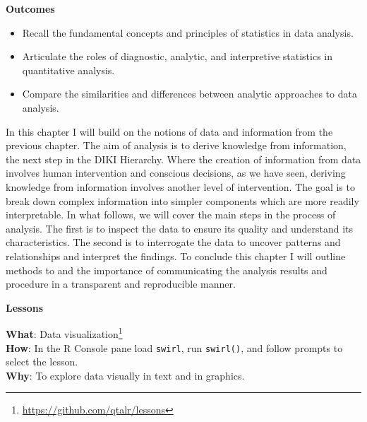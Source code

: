 \documentclass[
  letterpaper,
  DIV=11,
  numbers=noendperiod]{scrreport}
\providecommand{\tightlist}{%
  \setlength{\itemsep}{0pt}\setlength{\parskip}{0pt}}\usepackage{longtable,booktabs,array}
\theoremstyle{definition}
\theoremstyle{remark}
\DeclareRobustCommand{\href}[2]{#2\footnote{\url{#1}}}
\begin{document}
\begin{tcolorbox}[enhanced jigsaw, leftrule=.75mm, bottomrule=.15mm, opacityback=0, breakable, left=2mm, colback=white, toprule=.15mm, arc=.35mm, rightrule=.15mm]

\textbf{ Outcomes}

\begin{itemize}
\tightlist
\item
  Recall the fundamental concepts and principles of statistics in data
  analysis.
\item
  Articulate the roles of diagnostic, analytic, and interpretive
  statistics in quantitative analysis.
\item
  Compare the similarities and differences between analytic approaches
  to data analysis.
\end{itemize}

\end{tcolorbox}

In this chapter I will build on the notions of data and information from
the previous chapter. The aim of analysis is to derive knowledge from
information, the next step in the DIKI Hierarchy. Where the creation of
information from data involves human intervention and conscious
decisions, as we have seen, deriving knowledge from information involves
another level of intervention. The goal is to break down complex
information into simpler components which are more readily
interpretable. In what follows, we will cover the main steps in the
process of analysis. The first is to inspect the data to ensure its
quality and understand its characteristics. The second is to interrogate
the data to uncover patterns and relationships and interpret the
findings. To conclude this chapter I will outline methods to and the
importance of communicating the analysis results and procedure in a
transparent and reproducible manner.

\begin{tcolorbox}[enhanced jigsaw, leftrule=.75mm, bottomrule=.15mm, opacityback=0, breakable, left=2mm, colback=white, toprule=.15mm, arc=.35mm, rightrule=.15mm]

\textbf{ Lessons}

\textbf{What}: \href{https://github.com/qtalr/lessons}{Data
visualization}\\
\textbf{How}: In the R Console pane load \texttt{swirl}, run
\texttt{swirl()}, and follow prompts to select the lesson.\\
\textbf{Why}: To explore data visually in text and in graphics.

\end{tcolorbox}
\end{document}
